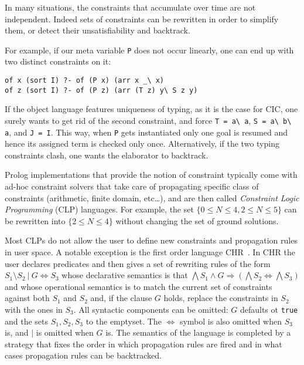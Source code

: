 \documentclass{easychair}
\begin{document}
In many situations, the constraints that accumulate over time are
not independent.  Indeed sets of constraints can be rewritten in order to
simplify them, or detect their unsatisfiability and backtrack.

For example, if our meta variable \verb+P+ does not occur linearly, one 
can end up with two distinct constraints on it:

\begin{verbatim}
of x (sort I) ?- of (P x) (arr x _\ x)
of z (sort I) ?- of (P z) (arr (T z) y\ S z y)
\end{verbatim}

If the object language features uniqueness of typing, as it is the case
for CIC, one surely wants to get rid of the second constraint, and
force \verb+T = a\ a+, \verb+S = a\ b\ a+, and \verb+J = I+.
This way, when \verb+P+ gets instantiated only one goal is resumed and hence
its assigned term is checked only once.  Alternatively,
if the two typing constraints clash, one wants the elaborator to backtrack.

Prolog implementations that provide the notion of constraint typically come
with ad-hoc constraint solvers that take care of propagating specific
class of constraints (arithmetic, finite domain, etc\ldots), and are
then called \emph{Constraint Logic Programming} (CLP) languages.
For example, the set $\{0 \leq N \leq 4, 2 \leq N \leq 5\}$ can be rewritten
into $\{2 \leq N \leq 4\}$ without changing the set of ground solutions.

Most CLPs do not allow the user to define new constraints and propagation
rules in user space. A notable exception is the first order language
CHR~\cite{chr}. In CHR the user declares predicates and then gives a set of
rewriting rules of the form $S_1 \setminus S_2 ~|~ G \iff S_3$ whose
declarative semantics is that $\bigwedge S_1 \wedge G \Rightarrow (\bigwedge
S_2 \iff \bigwedge S_3)$ and whose operational semantics is to match the
current set of constraints against both $S_1$ and $S_2$ and, if the clause $G$
holds, replace the constraints in $S_2$ with the ones in $S_3$. All syntactic
components can be omitted: $G$ defaults ot \verb+true+ and the sets
$S_1,S_2,S_3$ to the emptyset. The $\iff$ symbol is also omitted when $S_3$
is, and $|$ is omitted when $G$ is. The semantics of the language is completed
by a strategy that fixes the order in which propagation rules are fired and in
what cases propagation rules can be backtracked.
\end{document}
